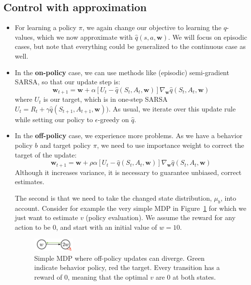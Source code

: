 \subsection{Control with approximation}
\begin{itemize}
	\item For learning a policy $\pi$, we again change our objective to learning the $q$-values, which we now approximate with $\hat{q}(s,a,\bm{w})$. We will focus on episodic cases, but note that everything could be generalized to the continuous case as well.
	\item In the \textbf{on-policy} case, we can use methods like (episodic) semi-gradient SARSA, so that our update step is:
	$$\bm{w}_{t+1}=\bm{w}+\alpha\left[U_t - \hat{q}(S_t,A_t,\bm{w})\right]\nabla_{\bm{w}}\hat{q}(S_t,A_t,\bm{w})$$
	where $U_t$ is our target, which is in one-step SARSA $U_t = R_t + \gamma \hat{q}(S_{t+1},A_{t+1},\bm{w}))$.
	As usual, we iterate over this update rule while setting our policy to $\epsilon$-greedy on $\hat{q}$.
	\item In the \textbf{off-policy} case, we experience more problems. As we have a behavior policy $b$ and target policy $\pi$, we need to use importance weight to correct the target of the update:
	$$\bm{w}_{t+1}=\bm{w}+\rho \alpha\left[U_t - \hat{q}(S_t,A_t,\bm{w})\right]\nabla_{\bm{w}}\hat{q}(S_t,A_t,\bm{w})$$
	Although it increases variance, it is necessary to guarantee unbiased, correct estimates.
	
	The second is that we need to take the changed state distribution, $\mu_b$, into account. Consider for example the very simple MDP in Figure~\ref{fig:rl_approximation_value_based_offpolicy_divergence} for which we just want to estimate $v$ (policy evaluation). We assume the reward for any action to be $0$, and start with an initial value of $w=10$.
		
	\begin{figure}[ht!]
		\centering
		\includegraphics[width=0.2\textwidth]{figures/rl_approximation_value_based_offpolicy_divergence.png}
		\caption{Simple MDP where off-policy updates can diverge. Green indicate behavior policy, red the target. Every transition has a reward of $0$, meaning that the optimal $v$ are 0 at both states.}
		\label{fig:rl_approximation_value_based_offpolicy_divergence}
	\end{figure}
	

\end{itemize}
